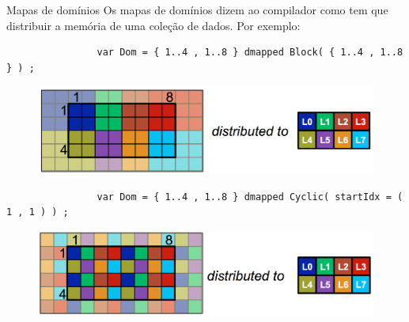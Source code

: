 		\begin{frame}[fragile]{Mapas de domínios}
			Os mapas de domínios dizem ao compilador como tem que distribuir a memória de uma coleção de dados. Por exemplo:
			\begin{lstlisting}
				var Dom = { 1..4 , 1..8 } dmapped Block( { 1..4 , 1..8 } ) ;
			\end{lstlisting}
			\begin{figure}
				\includegraphics[scale=0.3]{images/blockmap}
			\end{figure}
			\begin{lstlisting}
				var Dom = { 1..4 , 1..8 } dmapped Cyclic( startIdx = ( 1 , 1 ) ) ;
			\end{lstlisting}
			\begin{figure}
				\includegraphics[scale=0.3]{images/cyclicmap}
			\end{figure}
		\end{frame}
		
